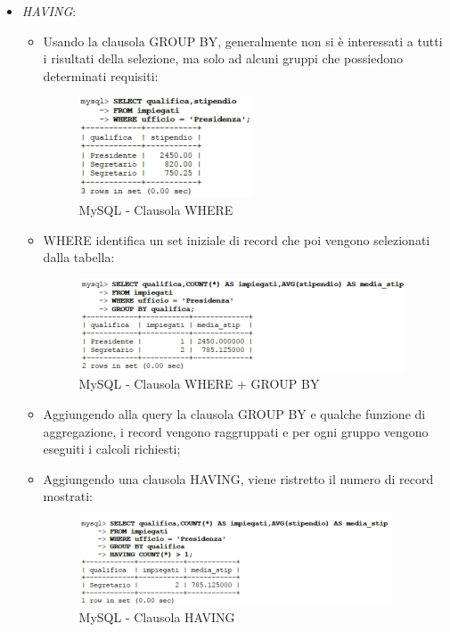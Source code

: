 \begin{itemize}
\item{\textit{HAVING}}:

\begin{itemize}

\item Usando la clausola GROUP BY, generalmente non si è interessati a tutti i risultati della selezione, ma solo ad alcuni gruppi che possiedono determinati requisiti:

\begin{center}
\begin{figure}[H]
\centering
\includegraphics[scale=1]{figures/mySQL_having.png}
\caption{MySQL - Clausola WHERE} 
\end{figure}
\end{center}

\item WHERE identifica un set iniziale di record che poi vengono selezionati dalla tabella:

\begin{center}
\begin{figure}[H]
\centering
\includegraphics[scale=1]{figures/mySQL_having2.png}
\caption{MySQL - Clausola WHERE + GROUP BY} 
\end{figure}
\end{center}

\item Aggiungendo alla query la clausola GROUP BY e qualche funzione di aggregazione, i record vengono raggruppati e per ogni gruppo vengono eseguiti i calcoli richiesti;

\item Aggiungendo una clausola HAVING, viene ristretto il numero di record mostrati:

\begin{center}
\begin{figure}[H]
\centering
\includegraphics[scale=1]{figures/mySQL_having3.png}
\caption{MySQL - Clausola HAVING} 
\end{figure}
\end{center}


\end{itemize}
\end{itemize}

